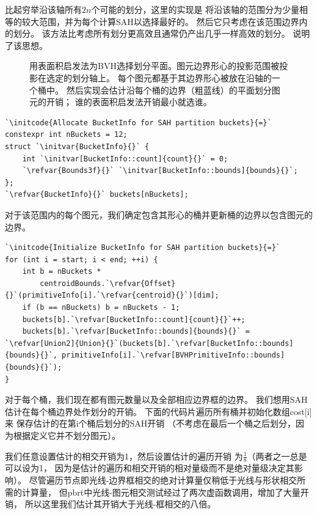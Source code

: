 比起穷举沿该轴所有$2n$个可能的划分，这里的实现是
将沿该轴的范围分为少量相等的较大范围，并为每个计算SAH以选择最好的。
然后它只考虑在该范围边界内的划分。
该方法比考虑所有划分更高效且通常仍产出几乎一样高效的划分。
说明了该思想。
\begin{figure}[htbp]
    \centering
    \caption{用表面积启发法为BVH选择划分平面。图元边界形心的投影范围被投影在选定的划分轴上。
        每个图元都基于其边界形心被放在沿轴的一个桶中。
        然后实现会估计沿每个桶的边界（粗蓝线）的平面划分图元的开销；
        谁的表面积启发法开销最小就选谁。}
    \label{fig:4.6}
\end{figure}
\begin{lstlisting}
`\initcode{Allocate BucketInfo for SAH partition buckets}{=}`
constexpr int nBuckets = 12;
struct `\initvar{BucketInfo}{}` {
    int `\initvar[BucketInfo::count]{count}{}` = 0;
    `\refvar{Bounds3f}{}` `\initvar[BucketInfo::bounds]{bounds}{}`;
};
`\refvar{BucketInfo}{}` buckets[nBuckets];
\end{lstlisting}

对于该范围内的每个图元，我们确定包含其形心的桶\protect{}并更新桶的边界以包含图元的边界。
\begin{lstlisting}
`\initcode{Initialize BucketInfo for SAH partition buckets}{=}`
for (int i = start; i < end; ++i) {
    int b = nBuckets * 
        centroidBounds.`\refvar{Offset}{}`(primitiveInfo[i].`\refvar{centroid}{}`)[dim];
    if (b == nBuckets) b = nBuckets - 1;
    buckets[b].`\refvar[BucketInfo::count]{count}{}`++;
    buckets[b].`\refvar[BucketInfo::bounds]{bounds}{}` = `\refvar[Union2]{Union}{}`(buckets[b].`\refvar[BucketInfo::bounds]{bounds}{}`, primitiveInfo[i].`\refvar[BVHPrimitiveInfo::bounds]{bounds}{}`);
}
\end{lstlisting}

对于每个桶，我们现在都有图元数量以及全部相应边界框的边界。
我们想用SAH估计在每个桶边界处作划分的开销。
下面的代码片遍历所有桶并初始化数组{\ttfamily cost[i]}来
保存估计的在第{\ttfamily i}个桶后划分的SAH开销
（不考虑在最后一个桶之后划分，因为根据定义它并不划分图元）。

我们任意设置估计的相交开销为1，然后设置估计的遍历开销
为$\displaystyle\frac{1}{8}$（两者之一总是可以设为1，
因为是估计的遍历和相交开销的相对量级而不是绝对量级决定其影响）。
尽管遍历节点即光线-边界框相交的绝对计算量仅稍低于光线与形状相交所需的计算量，
但pbrt中光线-图元相交测试经过了两次虚函数调用，增加了大量开销，
所以这里我们估计其开销大于光线-框相交的八倍。

